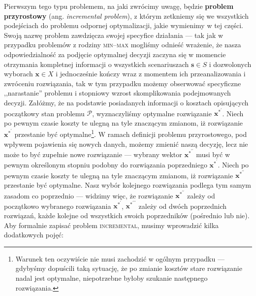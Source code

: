 Pierwszym tego typu problemem, na jaki zwrócimy uwagę, będzie \textbf{problem przyrostowy} (ang. \textit{incremental problem}), z którym zetkniemy się we wszystkich podejściach do problemu odpornej optymalizacji, jakie wymienimy w tej części. Swoją nazwę problem zawdzięcza swojej specyfice działania --- tak jak w przypadku problemów z rodziny \textsc{min--max} mogliśmy odnieść wrażenie, że nasza odpowiedzialność za podjęcie optymalnej decyzji zaczyna się w momencie otrzymania kompletnej informacji o wszystkich scenariuszach $\textbf{s} \in S$ i dozwolonych wyborach $\textbf{x} \in X$ i jednocześnie kończy wraz z momentem ich przeanalizowania i zwróceniu rozwiązania, tak w tym przypadku możemy obserwować specyficzne ,,narastanie'' problemu i stopniowy wzrost skomplikowania podejmowanych decyzji. Załóżmy, że na podstawie posiadanych informacji o kosztach opisujących początkowy stan problemu $\mathcal{P}$, wyznaczyliśmy optymalne rozwiązanie $\textbf{x}^{\ast^{\prime}}$. Niech po pewnym czasie koszty te ulegną na tyle znaczącym zmianom, iż rozwiązanie $\textbf{x}^{\ast^{\prime}}$ przestanie być optymalne\footnote{Warunek ten oczywiście nie musi zachodzić w ogólnym przypadku --- gdybyśmy dopuścili taką sytuację, że po zmianie kosztów stare rozwiązanie nadal jest optymalne, niepotrzebne byłoby szukanie następnego rozwiązania.}. W ramach definicji problemu przyrostowego, pod wpływem pojawienia się nowych danych, możemy zmienić naszą decyzję, lecz nie może to być zupełnie nowe rozwiązanie --- wybrany wektor $\textbf{x}^{\ast^{\prime\prime}}$ musi być w pewnym określonym stopniu podobny do rozwiązania poprzedniego $\textbf{x}^{\ast^{\prime}}$.  Niech po pewnym czasie koszty te ulegną na tyle znaczącym zmianom, iż rozwiązanie $\textbf{x}^{\ast^{\prime\prime}}$ przestanie być optymalne. Nasz wybór kolejnego rozwiązania podlega tym samym zasadom co poprzednio --- widzimy więc, że rozwiązanie $\textbf{x}^{\ast^{\prime\prime}}$ zależy od początkowo wybranego rozwiązania $\textbf{x}^{\ast^{\prime}}$, $\textbf{x}^{\ast^{\prime\prime\prime}}$ zależy od dwóch poprzednich rozwiązań, każde kolejne od wszystkich swoich poprzedników (pośrednio lub nie). Aby formalnie zapisać problem \textsc{incremental}, musimy wprowadzić kilka dodatkowych pojęć:

